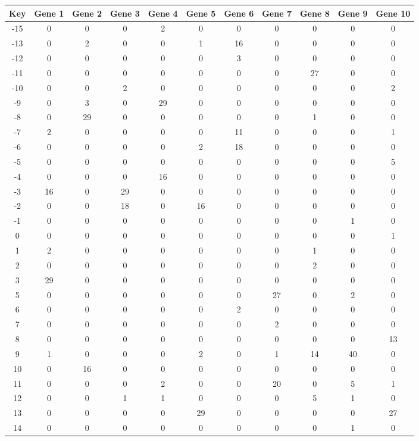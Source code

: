 \begin{tabular}{|c|c|c|c|c|c|c|c|c|c|c|}
\hline
Key & Gene 1 & Gene 2 & Gene 3 & Gene 4 & Gene 5 & Gene 6 & Gene 7 & Gene 8 & Gene 9 & Gene 10 \\
\hline
-15 & 0 & 0 & 0 & 2 & 0 & 0 & 0 & 0 & 0 & 0 \\
-13 & 0 & 2 & 0 & 0 & 1 & 16 & 0 & 0 & 0 & 0 \\
-12 & 0 & 0 & 0 & 0 & 0 & 3 & 0 & 0 & 0 & 0 \\
-11 & 0 & 0 & 0 & 0 & 0 & 0 & 0 & 27 & 0 & 0 \\
-10 & 0 & 0 & 2 & 0 & 0 & 0 & 0 & 0 & 0 & 2 \\
-9 & 0 & 3 & 0 & 29 & 0 & 0 & 0 & 0 & 0 & 0 \\
-8 & 0 & 29 & 0 & 0 & 0 & 0 & 0 & 1 & 0 & 0 \\
-7 & 2 & 0 & 0 & 0 & 0 & 11 & 0 & 0 & 0 & 1 \\
-6 & 0 & 0 & 0 & 0 & 2 & 18 & 0 & 0 & 0 & 0 \\
-5 & 0 & 0 & 0 & 0 & 0 & 0 & 0 & 0 & 0 & 5 \\
-4 & 0 & 0 & 0 & 16 & 0 & 0 & 0 & 0 & 0 & 0 \\
-3 & 16 & 0 & 29 & 0 & 0 & 0 & 0 & 0 & 0 & 0 \\
-2 & 0 & 0 & 18 & 0 & 16 & 0 & 0 & 0 & 0 & 0 \\
-1 & 0 & 0 & 0 & 0 & 0 & 0 & 0 & 0 & 1 & 0 \\
0 & 0 & 0 & 0 & 0 & 0 & 0 & 0 & 0 & 0 & 1 \\
1 & 2 & 0 & 0 & 0 & 0 & 0 & 0 & 1 & 0 & 0 \\
2 & 0 & 0 & 0 & 0 & 0 & 0 & 0 & 2 & 0 & 0 \\
3 & 29 & 0 & 0 & 0 & 0 & 0 & 0 & 0 & 0 & 0 \\
5 & 0 & 0 & 0 & 0 & 0 & 0 & 27 & 0 & 2 & 0 \\
6 & 0 & 0 & 0 & 0 & 0 & 2 & 0 & 0 & 0 & 0 \\
7 & 0 & 0 & 0 & 0 & 0 & 0 & 2 & 0 & 0 & 0 \\
8 & 0 & 0 & 0 & 0 & 0 & 0 & 0 & 0 & 0 & 13 \\
9 & 1 & 0 & 0 & 0 & 2 & 0 & 1 & 14 & 40 & 0 \\
10 & 0 & 16 & 0 & 0 & 0 & 0 & 0 & 0 & 0 & 0 \\
11 & 0 & 0 & 0 & 2 & 0 & 0 & 20 & 0 & 5 & 1 \\
12 & 0 & 0 & 1 & 1 & 0 & 0 & 0 & 5 & 1 & 0 \\
13 & 0 & 0 & 0 & 0 & 29 & 0 & 0 & 0 & 0 & 27 \\
14 & 0 & 0 & 0 & 0 & 0 & 0 & 0 & 0 & 1 & 0 \\
\hline
\end{tabular}